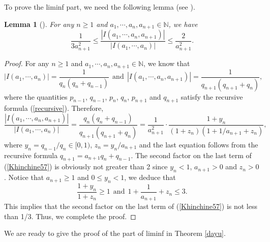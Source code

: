 \documentclass[reqno]{amsart}
\newtheorem{lemma}[theorem]{Lemma}
\theoremstyle{definition}
\numberwithin{equation}{section}
\begin{document}
To prove the liminf part, we need the following lemma (see \cite{lesKhi64}).

\begin{lemma} [\cite{lesKhi64}]\label{Khin57}
For any $n \geq 1$ and $a_1, \cdots, a_n, a_{n+1}\in \mathbb{N}$, we have
\begin{equation*}
\frac{1}{3a_{n+1}^2}\leq \frac{|I(a_1, \cdots, a_n, a_{n+1})|}{|I(a_1, \cdots, a_n)|} \leq \frac{2}{a_{n+1}^2}.
\end{equation*}
\end{lemma}

\begin{proof}
For any $n \geq 1$ and $a_1, \cdots, a_n, a_{n+1}\in \mathbb{N}$,
we know that
\[
|I(a_1, \cdots, a_n)| = \frac{1}{q_n(q_n+q_{n-1})}\ \ \text{and}\ \ |I(a_1, \cdots, a_n, a_{n+1})| = \frac{1}{q_{n+1}(q_{n+1}+q_n)},
\]
where the quantities $p_{n-1}$, $q_{n-1}$, $p_n$, $q_n$, $p_{n+1}$ and $q_{n+1}$ satisfy the recursive formula (\ref{recursive}). Therefore,
\begin{equation}\label{Khinchine57}
\frac{|I(a_1, \cdots, a_n, a_{n+1})|}{|I(a_1, \cdots, a_n)|}  = \frac{q_n(q_n+q_{n-1})}{q_{n+1}(q_{n+1}+q_n)} = \frac{1}{a^2_{n+1}} \cdot \frac{1+y_n}{(1+z_n)(1+1/a_{n+1}+z_n)},
\end{equation}
where $y_n = q_{n-1}/q_n \in [0,1)$, $z_n = y_n/a_{n+1}$ and the last equation follows from the recursive formula $q_{n+1} = a_{n+1}q_n + q_{n-1}$. The second factor on the last term of (\ref{Khinchine57}) is obviously not greater than 2 since $y_n<1$, $a_{n+1} >0$ and $z_n >0$. Notice that $a_{n+1} \geq 1$ and $0 \leq y_n<1$, we deduce that
\[
\frac{1+y_n}{1+z_n} \geq 1\ \ \text{and}\ \ 1+\frac{1}{a_{n+1}}+z_n \leq 3.
\]
This implies that the second factor on the last term of (\ref{Khinchine57}) is not less than 1/3. Thus, we complete the proof.
\end{proof}

We are ready to give the proof of the part of liminf in Theorem \ref{dayu}.
\end{document}

